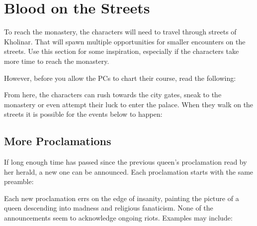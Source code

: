 \section{Blood on the Streets}
\label{sec:bloodyStreets}

To reach the monastery, the characters will need to travel through streets of Kholinar. That will spawn multiple opportunities for smaller encounters on the streets. Use this section for some inspiration, especially if the characters take more time to reach the monastery.

However, before you allow the PCs to chart their course, read the following:


From here, the characters can rush towards the city gates, sneak to the monastery or even attempt their luck to enter the palace. When they walk on the streets it is possible for the events below to happen:



\subsection{More Proclamations}
\label{ssec:bloodyStreetsProclamations}

If long enough time has passed since the previous queen’s proclamation read by her herald, a new one can be announced. Each proclamation starts with the same preamble:


Each new proclamation errs on the edge of insanity, painting the picture of a queen descending into madness and religious fanaticism. None of the announcements seem to acknowledge ongoing riots. Examples may include:

